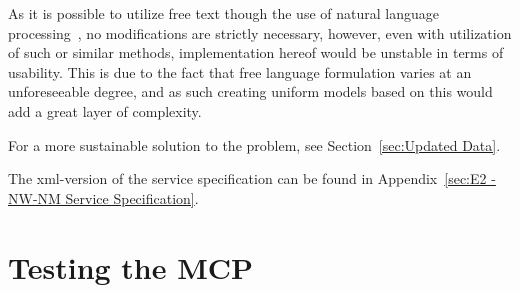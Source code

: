 As it is possible to utilize free text though the use of natural language processing~\cite{nlp}, no modifications are strictly necessary, however, even with utilization of such or similar methods, implementation hereof would be unstable in terms of usability. This is due to the fact that free language formulation varies at an unforeseeable degree, and as such creating uniform models based on this would add a great layer of complexity.

For a more sustainable solution to the problem, see Section~\ref{sec:Updated Data}.

The xml-version of the service specification can be found in Appendix~\ref{sec:E2 - NW-NM Service Specification}.

\section{Testing the MCP}

